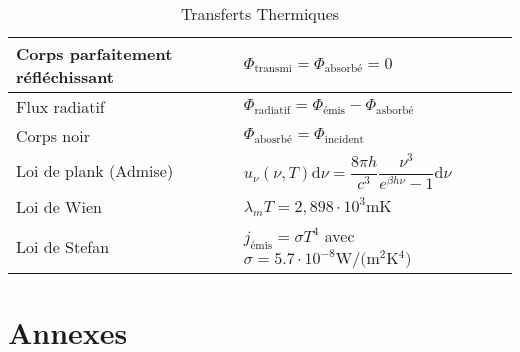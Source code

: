 \documentclass[10pt,a4paper,titlepage,landscape]{article}
\renewcommand{\d}
{
    \mathrm{d}
}
\begin{document}
\begin{table}[H]
\begin{tabular}{@{}|p{9cm}|p{10cm}@{}|}
        Corps parfaitement réfléchissant & $\Phi_{\text{transmi}} = \Phi_{\text{absorbé}} = 0$ \\ \hline
        Flux radiatif & $\Phi_{\text{radiatif}} = \Phi_{\text{émis}} - \Phi_{\text{asborbé}}$ \\ \hline 
        Corps noir & $\Phi_{\text{abosrbé}} = \Phi_{\text{incident}}$ \\ \hline
        Loi de plank (Admise) & $u_{\nu}(\nu, T)\d \nu = \dfrac{8\pi h}{c^3} \dfrac{\nu^3}{e^{\beta h \nu} - 1} \d \nu$ \\ \hline
        Loi de Wien & $\lambda_m T = 2,898\cdot10^3 \unit{\m\kelvin}$ \\ \hline
        Loi de Stefan & $j_{\text{émis}} = \sigma T ^4$ avec $\sigma = 5.7\cdot 10^{-8} \unit{\W\per(\m^2\kelvin^4)}$ \\ \hline
    \end{tabular}
\caption{Transferts Thermiques}
\label{tab:constantes}
\end{table}

\section{Annexes}
\end{document}
